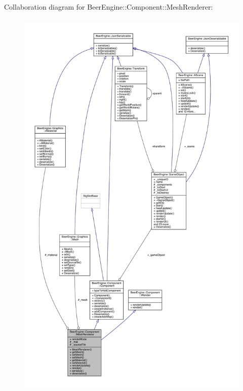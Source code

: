 Collaboration diagram for Beer\+Engine\+:\+:Component\+:\+:Mesh\+Renderer\+:
\nopagebreak
\begin{figure}[H]
\begin{center}
\leavevmode
\includegraphics[height=550pt]{class_beer_engine_1_1_component_1_1_mesh_renderer__coll__graph}
\end{center}
\end{figure}
